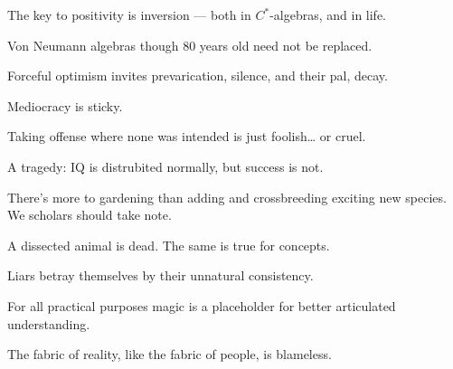 \documentclass[a]{subfiles}
\begin{document}
\begin{parsec}%
The key to positivity is inversion --- both in  $C^*$-algebras,
and in life.
\end{parsec}
\begin{parsec}%
Von Neumann algebras
though 80 years old
need not be replaced.
\end{parsec}
\begin{parsec}%
Forceful optimism
invites prevarication, silence,
and their pal, decay.
\end{parsec}
\begin{parsec}%
Mediocracy is sticky.
\end{parsec}
\begin{parsec}%
Taking offense where none was intended
is just foolish\dots{} or cruel.
\end{parsec}
\begin{parsec}%
A tragedy:
IQ is distrubited normally,
but success is not.
\end{parsec}
\begin{parsec}%
There's more to gardening
than adding and crossbreeding exciting new species.
We scholars should take note.
\end{parsec}
\begin{parsec}%
A dissected animal is dead.
The same is true for concepts.
\end{parsec}
\begin{parsec}%
Liars betray themselves by their
unnatural consistency.
\end{parsec}
\begin{parsec}%
For all practical purposes
magic is a placeholder for better
articulated understanding.
\end{parsec}
\begin{parsec}%
The fabric
of reality,
like the fabric of people,
is blameless.
\end{parsec}
\end{document}
